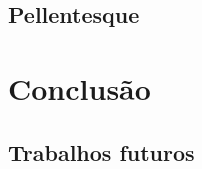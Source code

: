 \section{Pellentesque}

\lipsum[24]


\chapter{Conclusão}

\lipsum[11-12]


\section{Trabalhos futuros}

\lipsum[21-22]








